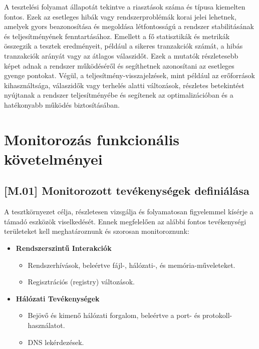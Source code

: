 \documentclass{scrreprt}
\begin{document}
A tesztelési folyamat állapotát tekintve a riasztások száma és típusa kiemelten fontos. Ezek az esetleges hibák vagy rendszerproblémák korai jelei lehetnek,
amelyek gyors beazonosítása és megoldása létfontosságú a rendszer stabilitásának és teljesítményének fenntartásához. Emellett a fő statisztikák és metrikák
összegzik a tesztek eredményeit, például a sikeres tranzakciók számát, a hibás tranzakciók arányát vagy az átlagos válaszidőt. Ezek a mutatók részletesebb
képet adnak a rendszer működéséről és segíthetnek azonosítani az esetleges gyenge pontokat. Végül, a teljesítmény-visszajelzések, mint például az erőforrások
kihasználtsága, válaszidők vagy terhelés alatti változások, részletes betekintést nyújtanak a rendszer teljesítményébe és segítenek az optimalizációban és a
hatékonyabb működés biztosításában.

\section{Monitorozás funkcionális követelményei}

\subsection{[M.01] Monitorozott tevékenységek definiálása} \label{M.01}
A tesztkörnyezet célja, részletesen vizsgálja és folyamatosan figyelemmel kísérje a támadó eszközök viselkedését. Ennek megfelelően az alábbi fontos
tevékenységi területeket kell meghatároznunk és szorosan monitoroznunk:

\begin{itemize}
      \item \textbf{Rendszerszintű Interakciók}
            \begin{itemize}
                  \item  Rendszerhívások, beleértve fájl-, hálózati-, és memória-műveleteket.
            \end{itemize}
            \begin{itemize}
                  \item  Regisztrációs (registry) változások.
            \end{itemize}
\end{itemize}

\begin{itemize}
      \item \textbf{Hálózati Tevékenységek}
            \begin{itemize}
                  \item  Bejövő és kimenő hálózati forgalom, beleértve a port- és protokoll-használatot.
            \end{itemize}
            \begin{itemize}
                  \item  DNS lekérdezések.
            \end{itemize}
\end{itemize}
\end{document}
